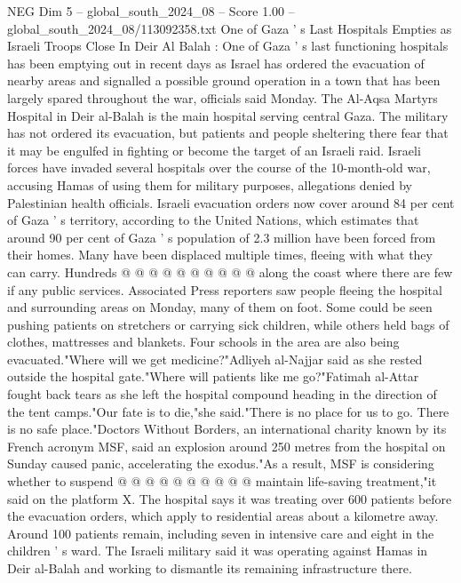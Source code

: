 \begin{textsample}{NEG Dim 5 – global\_south\_2024\_08 – Score 1.00 – global\_south\_2024\_08/113092358.txt}  \label{ex:f5_neg_130}
One of Gaza ' s Last Hospitals Empties as Israeli Troops Close In Deir Al Balah : One of Gaza ' s last functioning hospitals has been emptying out in recent days as Israel has ordered the evacuation of nearby areas and signalled a possible ground operation in a town that has been largely spared throughout the war, officials said Monday.
The Al-Aqsa Martyrs Hospital in Deir al-Balah is the main hospital serving central Gaza.
The military has not ordered its evacuation, but patients and people sheltering there fear that it may be engulfed in fighting or become the target of an Israeli raid.
Israeli forces have invaded several hospitals over the course of the 10-month-old war, accusing Hamas of using them for military purposes, allegations denied by Palestinian health officials.
Israeli evacuation orders now cover around 84 per cent of Gaza ' s territory, according to the United Nations, which estimates that around 90 per cent of Gaza ' s population of 2.3 million have been forced from their homes.
Many have been displaced multiple times, fleeing with what they can carry.
Hundreds @ @ @ @ @ @ @ @ @ @ along the coast where there are few if any public services.
Associated Press reporters saw people fleeing the hospital and surrounding areas on Monday, many of them on foot.
Some could be seen pushing patients on stretchers or carrying sick children, while others held bags of clothes, mattresses and blankets.
Four schools in the area are also being evacuated."Where will we get medicine?"Adliyeh al-Najjar said as she rested outside the hospital gate."Where will patients like me go?"Fatimah al-Attar fought back tears as she left the hospital compound heading in the direction of the tent camps."Our fate is to die,"she said."There is no place for us to go.
There is no safe place."Doctors Without Borders, an international charity known by its French acronym MSF, said an explosion around 250 metres from the hospital on Sunday caused panic, accelerating the exodus."As a result, MSF is considering whether to suspend @ @ @ @ @ @ @ @ @ @ maintain life-saving treatment,"it said on the platform X.
The hospital says it was treating over 600 patients before the evacuation orders, which apply to residential areas about a kilometre away.
Around 100 patients remain, including seven in intensive care and eight in the children ' s ward.
The Israeli military said it was operating against Hamas in Deir al-Balah and working to dismantle its remaining infrastructure there.

\end{textsample}
